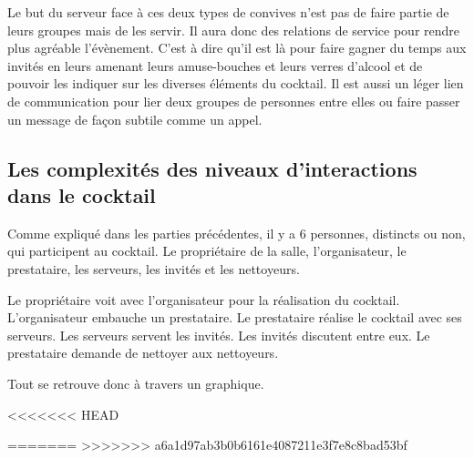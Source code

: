 Le but du serveur face à ces deux types de convives n’est pas de faire partie de leurs groupes mais de les servir. Il aura donc des relations de service pour rendre plus agréable l’évènement. C’est à dire qu’il est là pour faire gagner du temps aux invités en leurs amenant leurs amuse-bouches et leurs verres d’alcool et de pouvoir les indiquer sur les diverses éléments du cocktail. Il est aussi un léger lien de communication pour lier deux groupes de personnes entre elles ou faire passer un message de façon subtile comme un appel. 


\subsection{Les complexités des niveaux d'interactions dans le cocktail}

Comme expliqué dans les parties précédentes, il y a 6 personnes, distincts ou non, qui participent au cocktail. Le propriétaire de la salle, l’organisateur, le prestataire, les serveurs, les invités et les nettoyeurs.

Le propriétaire voit avec l’organisateur pour la réalisation du cocktail. L’organisateur embauche un prestataire. Le prestataire réalise le cocktail avec ses serveurs. Les serveurs servent les invités. Les invités discutent entre eux. Le prestataire demande de nettoyer aux nettoyeurs.

Tout se retrouve donc à travers un graphique.


<<<<<<< HEAD



=======
>>>>>>> a6a1d97ab3b0b6161e4087211e3f7e8c8bad53bf
